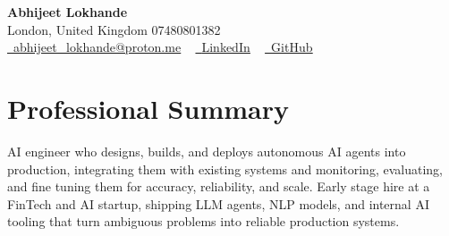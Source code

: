 \documentclass[a4paper,10pt]{article}
\begin{document}
    \begin{center}
        {\Huge\bfseries Abhijeet Lokhande}
        \\[2pt] {\color{muted}London, United Kingdom \textbar{} 07480801382}\\
        \small
        \href{mailto:abhijeet_lokhande@proton.me}{\raisebox{-0.2\height}{\color{primary}\faEnvelope}\  \underline{abhijeet\_lokhande@proton.me}} ~
        \href{https://www.linkedin.com/in/ablds/}{\raisebox{-0.2\height}{\color{primary}\faLinkedin}\ \underline{LinkedIn}}  ~
        \href{https://github.com/abhijeetscode}{\raisebox{-0.2\height}{\color{primary}\faGithub}\ \underline{GitHub}}
    \end{center}

\section{Professional Summary}
\vspace{-5pt}
{\color{muted}AI engineer who designs, builds, and deploys autonomous AI agents into production, integrating them with existing systems and monitoring, evaluating, and fine tuning them for accuracy, reliability, and scale. Early stage hire at a FinTech and AI startup, shipping LLM agents, NLP models, and internal AI tooling that turn ambiguous problems into reliable production systems.}
\vspace{2pt}

\end{document}
